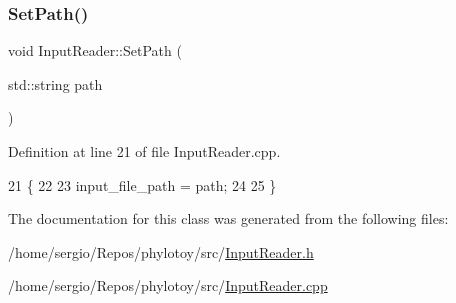 \subsubsection{\texorpdfstring{Set\+Path()}{SetPath()}}
{\footnotesize\ttfamily void Input\+Reader\+::\+Set\+Path (\begin{DoxyParamCaption}\item[{std\+::string}]{path }\end{DoxyParamCaption})}



Definition at line 21 of file Input\+Reader.\+cpp.


\begin{DoxyCode}
21                                         \{
22   
23   input\_file\_path = path;
24   
25 \}
\end{DoxyCode}


The documentation for this class was generated from the following files\+:\begin{DoxyCompactItemize}
\item 
/home/sergio/\+Repos/phylotoy/src/\hyperlink{InputReader_8h}{Input\+Reader.\+h}\item 
/home/sergio/\+Repos/phylotoy/src/\hyperlink{InputReader_8cpp}{Input\+Reader.\+cpp}\end{DoxyCompactItemize}
